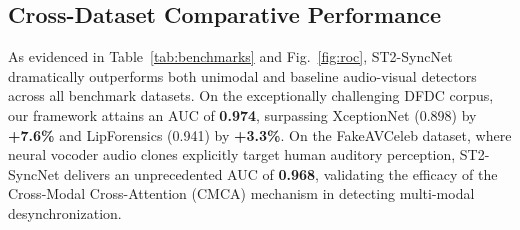 \documentclass[journal]{IEEEtran}
\begin{document}
\begin{table}[!t]
\caption{Comprehensive State-of-the-Art Forensic Performance Comparison across Benchmark Datasets}
\label{tab:benchmarks}
\centering
{}
\end{table}

\subsection{Cross-Dataset Comparative Performance}
As evidenced in Table~\ref{tab:benchmarks} and Fig.~\ref{fig:roc}, ST2-SyncNet dramatically outperforms both unimodal and baseline audio-visual detectors across all benchmark datasets. On the exceptionally challenging DFDC corpus, our framework attains an AUC of \textbf{0.974}, surpassing XceptionNet (0.898) by \textbf{+7.6\%} and LipForensics (0.941) by \textbf{+3.3\%}. On the FakeAVCeleb dataset, where neural vocoder audio clones explicitly target human auditory perception, ST2-SyncNet delivers an unprecedented AUC of \textbf{0.968}, validating the efficacy of the Cross-Modal Cross-Attention (CMCA) mechanism in detecting multi-modal desynchronization.
\end{document}
